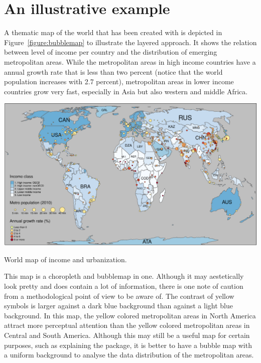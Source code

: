 %

\section{An illustrative example}


A thematic map of the world that has been created with  is depicted in Figure~\ref{figure:bubblemap} to illustrate the layered approach. It shows the relation between level of income per country and the distribution of emerging metropolitan areas. While the metropolitan areas in high income countries have a annual growth rate that is less than two percent (notice that the world population increases with 2.7 percent), metropolitan areas in lower income countries grow very fast, especially in Asia but also western and middle Africa.

\begin{widefigure}[htbp]
  \centering
  \includegraphics{bubbleMap2}
  \caption{World map of income and urbanization.}
  \label{figure:bubblemap}
\end{widefigure}

This map is a choropleth and bubblemap in one. Although it may aestetically look pretty and does contain a lot of information, there is one note of caution from a methodological point of view to be aware of. The contrast of yellow symbols is larger against a dark blue background than against a light blue background. In this map, the yellow colored metropolitan areas in North America attract more perceptual attention than the yellow colored metropolitan areas in Central and South America. Although this may still be a useful map for certain purposes, such as explaining the  package, it is better to have a bubble map with a uniform background to analyse the data distribution of the metropolitan areas.

